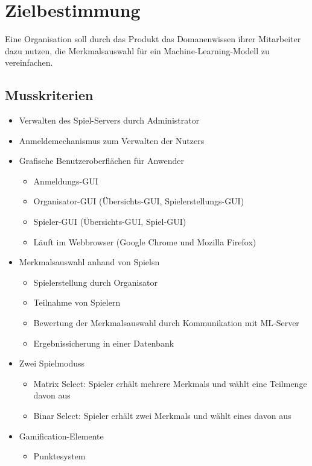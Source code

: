 \documentclass[a4paper]{scrreprt}
\begin{document}
    \chapter{Zielbestimmung}
    Eine Organisation soll durch das \Gls{Produkt} das \Gls{Domanenwissen} ihrer Mitarbeiter dazu nutzen, die Merkmalsauswahl für ein Machine-Learning-Modell zu vereinfachen.



    \section{Musskriterien}
    \begin{itemize} %
        \item Verwalten des \Gls{Spiel-Server}s durch \Gls{Administrator}
    	\item Anmeldemechanismus zum Verwalten der \Glspl{Nutzer}
	\item Grafische Benutzeroberflächen für Anwender 
        \begin{itemize}
            \item Anmeldungs-GUI
            \item \Gls{Organisator}-GUI (Übersichts-GUI, Spielerstellungs-GUI)
            \item \Gls{Spieler}-GUI (Übersichts-GUI, Spiel-GUI)
            \item Läuft im \Gls{Webbrowser} (Google Chrome und Mozilla Firefox)
        \end{itemize}
        \item Merkmalsauswahl anhand von \Glspl{Spiel}n  %
        \begin{itemize}
            \item Spielerstellung durch \Gls{Organisator}
            \item Teilnahme von \Gls{Spieler}n %
            \item Bewertung der Merkmalsauswahl durch Kommunikation mit \Gls{ML-Server}
            \item Ergebnissicherung in einer Datenbank 
        \end{itemize}
        \item Zwei \Glspl{Spielmodus}
        \begin{itemize}
            \item \Gls{Matrix Select}: \Gls{Spieler} erhält mehrere \Glspl{Merkmal} und wählt eine Teilmenge davon aus %
            \item \Gls{Binar Select}: \Gls{Spieler} erhält zwei \Glspl{Merkmal} und wählt eines davon aus
        \end{itemize}
        \item Gamification-Elemente
        \begin{itemize}
                  \item Punktesystem 
        \end{itemize}
    \end{itemize}
    \newpage %
\end{document}
